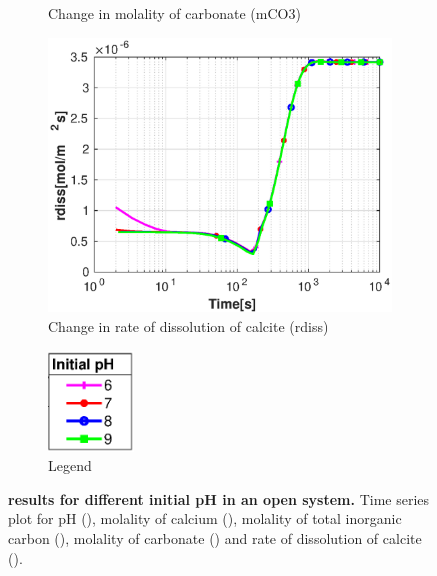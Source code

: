 \begin{figure}[!h]
\begin{subfigure}{.5\linewidth}
        \caption{\small Change in molality of carbonate (mCO3)}
        \label{fig:pHmCO3}
    \end{subfigure}%
    \hfill
    \begin{subfigure}{.5\linewidth}
            \centering
        \includegraphics[width=\textwidth]{PICTURES/with_pH_rdiss.eps}
        \caption{\small Change in rate of dissolution of calcite (rdiss)}
        \label{fig:pHrdiss}
    \end{subfigure}%
  \hfill
  \begin{subfigure}{.5\linewidth}
            \centering
        \includegraphics[width=0.25\textwidth]{PICTURES/with_pH_legend.eps}
        \caption{\small Legend}
        \label{fig:pHlegend}
    \end{subfigure}%
    \caption [\DuMuX results for different initial pH in an open system.] {\textbf{\DuMuX results for different initial pH in an open system.} 
    \small Time series plot for pH (), molality of calcium (), 
    molality of total inorganic carbon (), molality of carbonate () and rate of 
    dissolution of calcite ().}
    \label{fig:comparisionDiffInitialpH}
\end{figure} 


